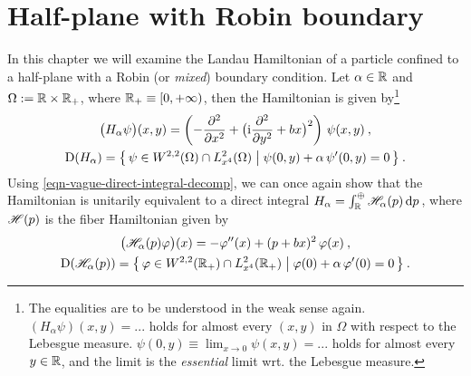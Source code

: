 \chapter{Half-plane with Robin boundary} \label{chapter-robin}
In this chapter we will examine the Landau Hamiltonian of a particle confined to a half-plane with a Robin (or \textit{mixed}) boundary condition. Let $\alpha \in \mathbb{R}$ and $\Omega := \mathbb{R} \times \mathbb{R}_+$, where $\mathbb{R}_+ \equiv [0, +\infty)$, then the Hamiltonian is given by\footnote{
    The equalities are to be understood in the weak sense again. $(H_\alpha \psi)(x, y) = ...$ holds for almost every $(x,y)$ in $\Omega$ with respect to the Lebesgue measure. $\psi(0,y) \equiv \lim_{x \to 0} \psi(x,y) = ...$ holds for almost every $y\in\mathbb{R}$, and the limit is the \textit{essential} limit wrt. the Lebesgue measure.
}
\begin{equation}
    \begin{gathered}
        \big( H_\alpha \psi \big)(x,y)
        = \left(
            -\frac{\partial ^2}{\partial x^2} +
            \big( \mathrm{i} \frac{\partial ^2}{\partial y^2} + bx \big)^2
        \right) \, \psi(x,y) \: ,
        \\
        \mathrm{D}(H_\alpha)
        = \big\{ \,
            \psi \in W^{2,2}(\Omega) \cap L^2_{x^4}(\Omega)
            \; \big| \;
            \psi(0,y) + \alpha \, \psi'(0,y) = 0
        \, \big\} \: .
    \end{gathered}
\end{equation}
Using \eqref{eqn-vague-direct-integral-decomp}, we can once again show that the Hamiltonian is unitarily equivalent to a direct integral $H_\alpha = \int^\oplus_{\mathbb{R}} \mathscr{H}_\alpha(p) \, \mathrm{d}p \,$, where $\mathscr{H}(p)$ is the fiber Hamiltonian given by
\begin{equation}
    \begin{gathered}
        \big( \mathscr{H}_\alpha(p) \varphi \big)(x)
        = -\varphi''(x) + (p + bx)^2 \, \varphi(x) \: ,
        \\
        \mathrm{D}( \mathscr{H}_\alpha(p) )
        = \big\{ \,
            \varphi \in W^{2,2}(\mathbb{R}_+) \cap L^2_{x^4}(\mathbb{R}_+)
            \; \big| \;
            \varphi(0) + \alpha \, \varphi'(0) = 0
        \, \big\} \: .
    \end{gathered}
\end{equation}

